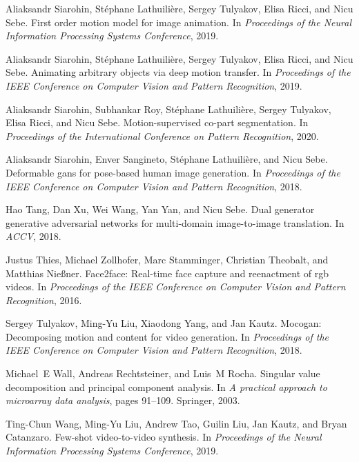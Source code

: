 \documentclass[final]{cvpr}
\begin{document}
\begin{thebibliography}{10}
Aliaksandr Siarohin, St{\'e}phane Lathuili{\`e}re, Sergey Tulyakov, Elisa
  Ricci, and Nicu Sebe.
\newblock First order motion model for image animation.
\newblock In {\em Proceedings of the Neural Information Processing Systems
  Conference}, 2019.

Aliaksandr Siarohin, Stéphane Lathuilière, Sergey Tulyakov, Elisa Ricci, and
  Nicu Sebe.
\newblock Animating arbitrary objects via deep motion transfer.
\newblock In {\em Proceedings of the IEEE Conference on Computer Vision and
  Pattern Recognition}, 2019.

Aliaksandr Siarohin, Subhankar Roy, Stéphane Lathuilière, Sergey Tulyakov,
  Elisa Ricci, and Nicu Sebe.
\newblock Motion-supervised co-part segmentation.
\newblock In {\em Proceedings of the International Conference on Pattern
  Recognition}, 2020.

Aliaksandr Siarohin, Enver Sangineto, St{\'e}phane Lathuili{\`e}re, and Nicu
  Sebe.
\newblock Deformable gans for pose-based human image generation.
\newblock In {\em Proceedings of the IEEE Conference on Computer Vision and
  Pattern Recognition}, 2018.

Hao Tang, Dan Xu, Wei Wang, Yan Yan, and Nicu Sebe.
\newblock Dual generator generative adversarial networks for multi-domain
  image-to-image translation.
\newblock In {\em ACCV}, 2018.

Justus Thies, Michael Zollhofer, Marc Stamminger, Christian Theobalt, and
  Matthias Nie{\ss}ner.
\newblock Face2face: Real-time face capture and reenactment of rgb videos.
\newblock In {\em Proceedings of the IEEE Conference on Computer Vision and
  Pattern Recognition}, 2016.

Sergey Tulyakov, Ming-Yu Liu, Xiaodong Yang, and Jan Kautz.
\newblock Mocogan: Decomposing motion and content for video generation.
\newblock In {\em Proceedings of the IEEE Conference on Computer Vision and
  Pattern Recognition}, 2018.

Michael~E Wall, Andreas Rechtsteiner, and Luis~M Rocha.
\newblock Singular value decomposition and principal component analysis.
\newblock In {\em A practical approach to microarray data analysis}, pages
  91--109. Springer, 2003.

Ting-Chun Wang, Ming-Yu Liu, Andrew Tao, Guilin Liu, Jan Kautz, and Bryan
  Catanzaro.
\newblock Few-shot video-to-video synthesis.
\newblock In {\em Proceedings of the Neural Information Processing Systems
  Conference}, 2019.


\end{thebibliography}
\end{document}
